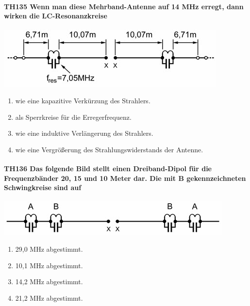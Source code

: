\documentclass[8pt]{article}
\begin{document}
\paragraph*{TH135 Wenn man diese Mehrband-Antenne auf 14 MHz erregt, dann wirken die LC-Resonanzkreise} 
\begin{center}
	\begin{minipage}{\linewidth}
		\centering
		\includegraphics[scale=1.0]{pics/th135_a.jpg}
	\end{minipage}
\end{center}
\begin{enumerate}[nolistsep,label=\Alph*]
\item wie eine kapazitive Verkürzung des Strahlers.
\item als Sperrkreise für die Erregerfrequenz.
\item wie eine induktive Verlängerung des Strahlers.
\item wie eine Vergrößerung des Strahlungswiderstands der Antenne.
\end{enumerate}

\paragraph*{TH136 Das folgende Bild stellt einen Dreiband-Dipol für die Frequenzbänder 20, 15 und 10 Meter dar. Die mit B gekennzeichneten Schwingkreise sind auf} 
\begin{center}
	\begin{minipage}{\linewidth}
		\centering
		\includegraphics[scale=1.0]{pics/th136_a.jpg}
	\end{minipage}
\end{center}
\begin{enumerate}[nolistsep,label=\Alph*]
\item 29,0 MHz abgestimmt.
\item 10,1 MHz abgestimmt.
\item 14,2 MHz abgestimmt.
\item 21,2 MHz abgestimmt.
\end{enumerate}
\end{document}
